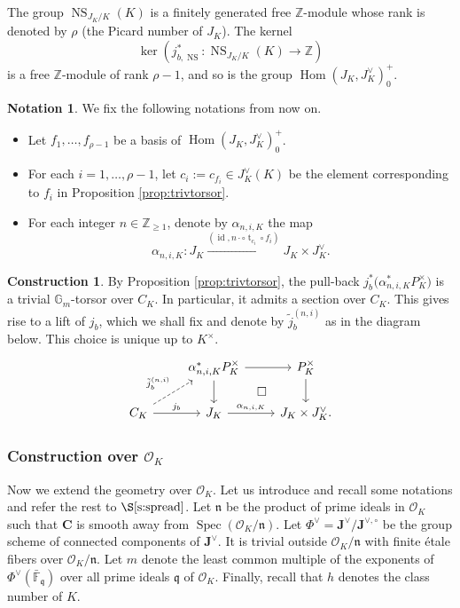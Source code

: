 \documentclass[11pt,oneside]{amsart}
\theoremstyle{plain}
\theoremstyle{definition}
\newtheorem{construction}[theorem]{Construction}
\newtheorem{notation}[theorem]{Notation}
\def\G{{\bf G}}
\DeclareMathOperator{\NS}{NS}
\DeclareMathOperator{\id}{id} \DeclareMathOperator{\Sel}{Sel}
\DeclareMathOperator{\Hom}{Hom}
\DeclareMathOperator{\spec}{Spec} \DeclareMathOperator{\sgn}{sign}
\DeclareMathOperator{\tr}{t}
\def\Z{\mathbb{Z}}
\def\F{\mathbb{F}}
\def\J{\mathbf{J}}
\def\Jo{\mathbf{J}^{\vee,\circ}}
\def\G{\mathbb{G}}
\def\CC{\mathbf{C}}
\def\ra{\rightarrow}
\def\oh{\mathcal{O}}
\begin{document}
The group $\NS_{J_K/K}(K)$ is a finitely generated free $\Z$-module whose rank is denoted by $\rho$ (the Picard number of $J_K$). The kernel 
$$\ker (j_{b, \NS}^*: \NS_{J_K/K} (K) \ra \Z)$$ is a free $\Z$-module of rank $\rho-1$, and so is the group $\Hom(J_K, J_K^\vee)_0^+$.

\begin{notation} \label{notation:f_i} 
We fix the following notations from now on.
\begin{itemize} 
\item Let $f_1, \ldots, f_{\rho-1}$ be a basis of $\Hom(J_K, J_K^\vee)_0^+$. 
\item For each $i=1, \ldots, \rho-1$, let $c_i:=c_{f_i}\in J_K^\vee(K)$ be the element corresponding to $f_i$ in Proposition \ref{prop:trivtorsor}.
\item For each integer $n\in \mathbb{Z}_{\ge 1}$, denote by $\alpha_{n, i, K}$ the map 
$$
\alpha_{n, i, K}: J_K \xrightarrow{(\id, n\cdot \circ \tr_{c_i} \circ f_i)} J_K\times J_K^\vee.
$$
\end{itemize}
\end{notation}

\begin{construction}\label{cons:lifting_over_K} By Proposition \ref{prop:trivtorsor}, the pull-back $j_b^* \big( \alpha_{n, i, K}^* P_K^\times \big)$ is a trivial $\G_m$-torsor over $C_K$. 
In particular, it admits a section over $C_K$. This gives rise to a lift of $j_b$, which we shall fix and denote by $\tilde{j}_{b}^{(n, i)}$ as in the diagram below.  This choice is unique up to $K^\times$.
\begin{equation}\label{diag:AJliftK}
\begin{tikzcd}[bend angle = 20]
  & \alpha_{n, i, K}^* P_K^\times  \arrow{r} \arrow{d} \arrow[phantom]{dr}{\square}
  & P_K^\times \arrow{d} \\
  C_K \arrow{r}{j_b} \arrow[dashrightarrow]{ru}{\tilde{j}_{b}^{(n, i)}}
  & J_K \arrow{r}{\alpha_{n, i, K}}
  & J_K\times J_K^\vee.
\end{tikzcd}
\end{equation}
\end{construction}

 

\subsubsection{Construction over $\oh_K$}

Now we extend the geometry over $\oh_K$. Let us introduce and recall some notations and refer the rest to $\S \ref{s:spread}$. Let $\mathfrak{n}$ be the product of prime ideals in $\oh_K$ such that $\CC$ is smooth away from $\spec(\oh_K/\mathfrak{n})$. Let $\Phi^\vee = \J^\vee / \Jo$ be the group scheme of connected components of $\J^\vee$. It is trivial outside $\oh_K/\mathfrak{n}$ with finite \'etale fibers over $\oh_K/\mathfrak{n}$. Let $m$ denote the least common multiple of the exponents of $\Phi^\vee(\bar{\F}_\mathfrak{q})$ over all prime ideals $\mathfrak{q}$ of $\oh_K$. Finally, recall that $h$ denotes the class number of $K$. 
\end{document}
